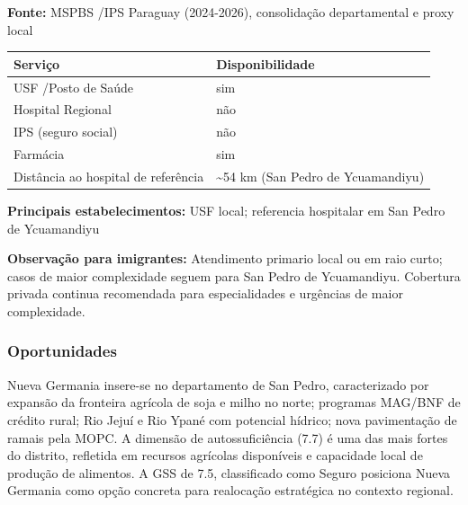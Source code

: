 \textbf{Fonte:} MSPBS /\allowbreak  IPS Paraguay (2024-2026), consolidação
departamental e proxy local

{\def\LTcaptype{none} %
\begin{longtable}[]{@{}
  >{\raggedright\arraybackslash}p{}
  >{\raggedright\arraybackslash}p{}@{}}
\toprule\noalign{}
\begin{minipage}[b]{\linewidth}\raggedright
Serviço
\end{minipage} & \begin{minipage}[b]{\linewidth}\raggedright
Disponibilidade
\end{minipage} \\
\midrule\noalign{}
\endhead
\bottomrule\noalign{}
\endlastfoot
USF /\allowbreak  Posto de Saúde & sim \\
Hospital Regional & não \\
IPS (seguro social) & não \\
Farmácia & sim \\
Distância ao hospital de referência & \textasciitilde54 km (San Pedro de
Ycuamandiyu) \\
\end{longtable}
}

\textbf{Principais estabelecimentos:} USF local; referencia hospitalar
em San Pedro de Ycuamandiyu

\textbf{Observação para imigrantes:} Atendimento primario local ou em
raio curto; casos de maior complexidade seguem para San Pedro de
Ycuamandiyu. Cobertura privada continua recomendada para especialidades
e urgências de maior complexidade.
\newpage

\subsubsection*{Oportunidades}\label{oport-nueva-germania-0207}
Nueva Germania insere-se no departamento de San Pedro, caracterizado por expansão da fronteira agrícola de soja e milho no norte; programas MAG/BNF de crédito rural; Rio Jejuí e Rio Ypané com potencial hídrico; nova pavimentação de ramais pela MOPC. A dimensão de autossuficiência (7.7) é uma das mais fortes do distrito, refletida em recursos agrícolas disponíveis e capacidade local de produção de alimentos. A GSS de 7.5, classificado como Seguro posiciona Nueva Germania como opção concreta para realocação estratégica no contexto regional.

